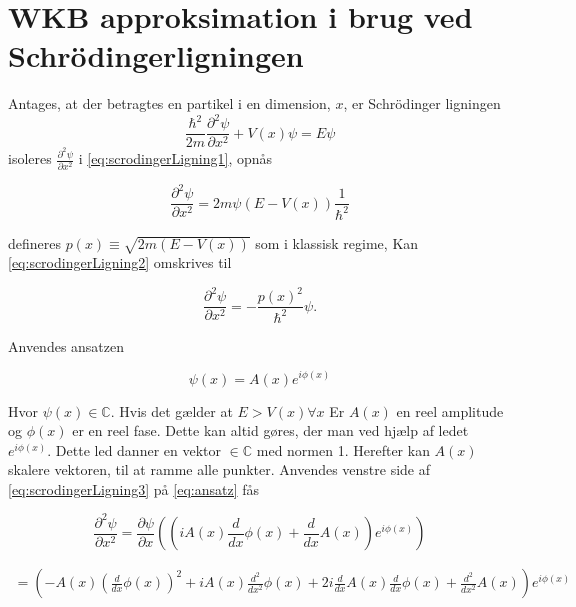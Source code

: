 \section{WKB approksimation i brug ved Schrödingerligningen}
Antages, at der betragtes en partikel i en dimension, $x$,  er Schrödinger ligningen
%
\begin{equation}
    \frac{\hbar^2}{2m}\frac{\partial^2 \psi}{\partial x^2} + V(x) \psi = E \psi
    \label{eq:scrodingerLigning1}
\end{equation}
%
isoleres $\frac{\partial^2 \psi}{\partial x^2}$ i \cref{eq:scrodingerLigning1}, opnås

\begin{equation}
    \frac{\partial^2 \psi}{\partial x^2} = 2m\psi (E  - V(x)) \frac{1}{\hbar^2}
    \label{eq:scrodingerLigning2}
\end{equation}

defineres $p(x) \equiv \sqrt{2m(E-V(x))}$ som i klassisk regime, Kan \cref{eq:scrodingerLigning2} omskrives til

\begin{equation}
    \frac{\partial^2 \psi}{\partial x^2} = - \frac{p(x)^2}{\hbar^2} \psi.
    \label{eq:scrodingerLigning3}
\end{equation}

Anvendes ansatzen

\begin{equation}
    \psi(x) = A(x) e^{i \phi(x)}
    \label{eq:ansatz}
\end{equation}

Hvor $\psi (x) \in \mathbb{C}$. Hvis det gælder at $ E > V(x) \forall x$ Er $A(x)$ en reel amplitude og $\phi(x)$ er en reel fase. Dette kan altid gøres, der man ved hjælp af ledet  $e^{i \phi(x)} $. Dette led danner en vektor $ \in \mathbb{C}$ med normen 1. Herefter kan $A(x)$  skalere vektoren, til at ramme alle punkter. Anvendes venstre side af \cref{eq:scrodingerLigning3} på \cref{eq:ansatz} fås

\begin{equation}
    \frac{\partial^2 \psi}{\partial x^2} = \frac{\partial \psi}{\partial x} \left( \left(i A{\left (x \right )} \frac{d}{d x} \phi{\left (x \right )} + \frac{d}{d x} A{\left (x \right )}\right) e^{i \phi{\left (x \right)}} \right)
    \label{eq:diff1gange}
\end{equation}

\begin{align}
    = \left(- A{\left (x \right )} \left(\frac{d}{d x} \phi{\left (x \right )}\right)^{2} + i A{\left (x \right )} \frac{d^{2}}{d x^{2}}  \phi{\left (x \right )} + 2 i \frac{d}{d x} A{\left (x \right )} \frac{d}{d x} \phi{\left (x \right )} + \frac{d^{2}}{d x^{2}}  A{\left (x \right )}\right) e^{i \phi{\left (x \right )}}
    \label{eq:diff2gange}
\end{align}

